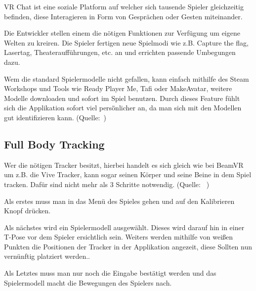 VR Chat ist eine soziale Platform auf welcher sich tausende Spieler gleichzeitig befinden, diese Interagieren in Form von Gespr\"achen oder Gesten miteinander.

Die Entwickler stellen einem die n\"otigen Funktionen zur Verf\"ugung um eigene Welten zu kreiren. Die Spieler fertigen neue Spielmodi wie z.B. Capture the flag, Lasertag, Theaterauff\"uhrungen, etc. an und errichten passende Umbegungen dazu.

Wem die standard Spielermodelle nicht gefallen, kann einfach mithilfe des Steam Workshops und Tools wie Ready Player Me, Tafi oder MakeAvatar, weitere Modelle downloaden und sofort im Spiel benutzen.
Durch dieses Feature f\"uhlt sich die Applikation sofort viel pers\"önlicher an, da man sich mit den Modellen gut identifizieren kann.
(Quelle:~\cite{VRChat_2021_AvatarCreator})

\subsection{Full Body Tracking}
\label{sec:vrchat_fullbodytracking}
Wer die n\"otigen Tracker besitzt, hierbei handelt es sich gleich wie bei BeamVR um z.B. die Vive Tracker, kann sogar seinen K\"orper und seine Beine in dem Spiel tracken.
Dafür sind nicht mehr als 3 Schritte notwendig.
(Quelle: ~\cite{VRChat_2021_FullBodyTracking})

Als erstes muss man in das Men\"u des Spieles gehen und auf den Kalibrieren Knopf dr\"ucken.

Als n\"achstes wird ein Spielermodell ausgew\"ahlt.
Dieses wird darauf hin in einer T-Pose vor dem Spieler ersichtlich sein.
Weiters werden mithilfe von weißen Punkten die Positionen der Tracker in der Applikation angezeit, diese Sollten nun vern\"unftig platziert werden..

Als Letztes muss man nur noch die Eingabe best\"atigt werden und das Spielermodell macht die Bewegungen des Spielers nach.

